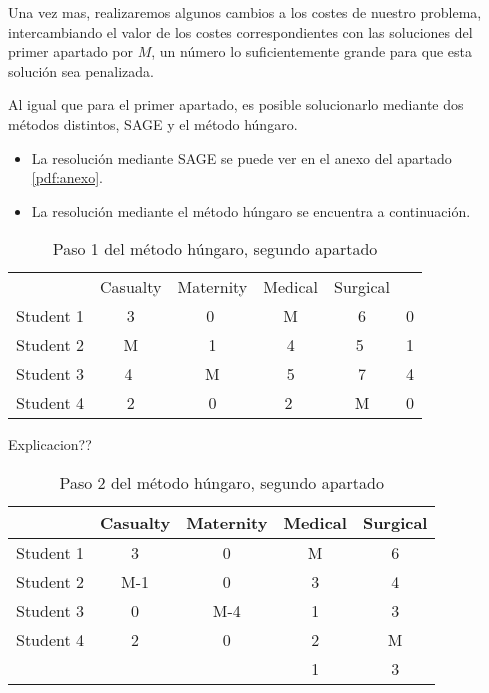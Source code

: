 \documentclass[11pt]{article}
\begin{document}
Una vez mas,  realizaremos algunos cambios a los costes de nuestro problema, intercambiando el valor de los costes correspondientes con las soluciones del primer apartado por $M$, un número lo suficientemente grande para que esta solución sea penalizada.

Al igual que para el primer apartado, es posible solucionarlo mediante dos métodos distintos, SAGE y el método húngaro.

\begin{itemize}
    \item La resolución mediante SAGE se puede ver en el anexo del apartado \ref{pdf:anexo}.
    \item La resolución mediante el método húngaro se encuentra a continuación.\\
\end{itemize}

\begin{table}[H]
\centering
\begin{tabular}{lccccl}
\cline{1-5}
 & \multicolumn{1}{l}{Casualty} & \multicolumn{1}{l}{Maternity} & \multicolumn{1}{l}{Medical} & \multicolumn{1}{l}{Surgical} &  \\ \cline{1-5}
Student 1 & 3 & \textcircled{0} & M & 6 & 0 \\
Student 2 & M & 1 & 4 & \textcircled{5} & 1 \\
Student 3 & \textcircled{4} & M & 5 & 7 & 4 \\
Student 4 & 2 & 0 & \textcircled{2} & M & 0 \\ \cline{1-5}
\end{tabular}
\caption{Paso 1 del método húngaro, segundo apartado}
\end{table}

Explicacion??


\begin{table}[H]
\centering
\begin{tabular}{lcccc}
\hline
 & \multicolumn{1}{l}{Casualty} & \multicolumn{1}{l}{Maternity} & \multicolumn{1}{l}{Medical} & \multicolumn{1}{l}{Surgical} \\ \hline
Student 1 & 3 & 0 & M & 6 \\
Student 2 & M-1 & 0 & 3 & 4 \\
Student 3 & 0 & M-4 & 1 & 3 \\
Student 4 & 2 & 0 & 2 & M \\ \hline
& & & 1 & 3
\end{tabular}
\caption{Paso 2 del método húngaro, segundo apartado}
\end{table}
\end{document}
